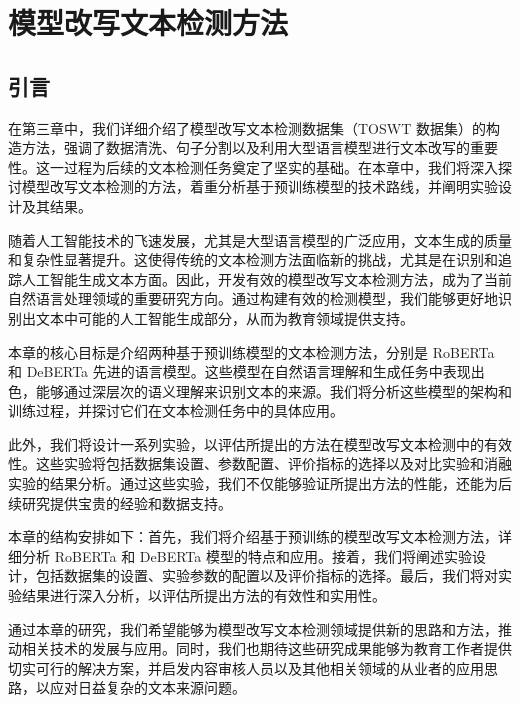 
\chapter{模型改写文本检测方法}
\label{chap:method}

\section{引言}
\label{sec:method-intro}

在第三章中，我们详细介绍了模型改写文本检测数据集（TOSWT 数据集）的构造方法，强调了数据清洗、句子分割以及利用大型语言模型进行文本改写的重要性。这一过程为后续的文本检测任务奠定了坚实的基础。在本章中，我们将深入探讨模型改写文本检测的方法，着重分析基于预训练模型的技术路线，并阐明实验设计及其结果。

随着人工智能技术的飞速发展，尤其是大型语言模型的广泛应用，文本生成的质量和复杂性显著提升。这使得传统的文本检测方法面临新的挑战，尤其是在识别和追踪人工智能生成文本方面。因此，开发有效的模型改写文本检测方法，成为了当前自然语言处理领域的重要研究方向。通过构建有效的检测模型，我们能够更好地识别出文本中可能的人工智能生成部分，从而为教育领域提供支持。

本章的核心目标是介绍两种基于预训练模型的文本检测方法，分别是 RoBERTa 和 DeBERTa 先进的语言模型。这些模型在自然语言理解和生成任务中表现出色，能够通过深层次的语义理解来识别文本的来源。我们将分析这些模型的架构和训练过程，并探讨它们在文本检测任务中的具体应用。

此外，我们将设计一系列实验，以评估所提出的方法在模型改写文本检测中的有效性。这些实验将包括数据集设置、参数配置、评价指标的选择以及对比实验和消融实验的结果分析。通过这些实验，我们不仅能够验证所提出方法的性能，还能为后续研究提供宝贵的经验和数据支持。

本章的结构安排如下：首先，我们将介绍基于预训练的模型改写文本检测方法，详细分析 RoBERTa 和 DeBERTa 模型的特点和应用。接着，我们将阐述实验设计，包括数据集的设置、实验参数的配置以及评价指标的选择。最后，我们将对实验结果进行深入分析，以评估所提出方法的有效性和实用性。

通过本章的研究，我们希望能够为模型改写文本检测领域提供新的思路和方法，推动相关技术的发展与应用。同时，我们也期待这些研究成果能够为教育工作者提供切实可行的解决方案，并启发内容审核人员以及其他相关领域的从业者的应用思路，以应对日益复杂的文本来源问题。


